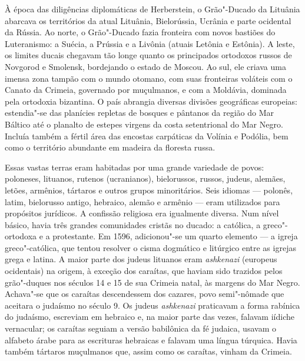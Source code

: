 À época das diligências diplomáticas de Herberstein, o Grão"-Ducado da
Lituânia abarcava os territórios da atual Lituânia, Bielorússia, Ucrânia
e parte ocidental da Rússia. Ao norte, o Grão"-Ducado fazia fronteira com
novos bastiões do Luteranismo: a Suécia, a Prússia e a Livônia (atuais
Letônia e Estônia). A leste, os limites ducais chegavam tão longe quanto
os principados ortodoxos russos de Novgorod e Smolensk, bordejando o
estado de Moscou. Ao sul, ele criava uma imensa zona tampão com o mundo
otomano, com suas fronteiras voláteis com o Canato da Crimeia, governado
por muçulmanos, e com a Moldávia, dominada pela ortodoxia bizantina. O
país abrangia diversas divisões geográficas europeias: estendia"-se das
planícies repletas de bosques e pântanos da região do Mar Báltico até o
planalto de estepes virgens da costa setentrional do Mar Negro. Incluía
também a fértil área das encostas carpáticas da Volínia e Podólia, bem
como o território abundante em madeira da floresta russa.

Essas vastas terras eram habitadas por uma grande variedade de povos:
poloneses, lituanos, rutenos (ucranianos), bielorussos, russos, judeus,
alemães, letões, armênios, tártaros e outros grupos minoritários. Seis
idiomas --- polonês, latim, bielorusso antigo, hebraico, alemão e armênio ---
eram utilizados para propósitos jurídicos. A confissão religiosa era
igualmente diversa. Num nível básico, havia três grandes comunidades
cristãs no ducado: a católica, a greco"-ortodoxa e a protestante. Em
1596, adicionou"-se um quarto elemento --- a igreja greco"-católica, que
tentou resolver o cisma dogmático e litúrgico entre as igrejas grega e
latina. A maior parte dos judeus lituanos eram \textit{ashkenazi} (europeus
ocidentais) na origem, à exceção dos caraítas, que haviam sido trazidos
pelos grão"-duques nos séculos 14 e 15 de sua Crimeia natal, às margens
do Mar Negro. Achava"-se que os caraítas descendessem dos cazares, povo
semi"-nômade que aceitara o judaísmo no século 9. Os judeus \textit{ashkenazi}
praticavam a forma rabínica do judaísmo, escreviam em hebraico e, na
maior parte das vezes, falavam iídiche vernacular; os caraítas seguiam a
versão babilônica da fé judaica, usavam o alfabeto árabe para as
escrituras hebraicas e falavam uma língua túrquica. Havia também
tártaros muçulmanos que, assim como os caraítas, vinham da Crimeia.

